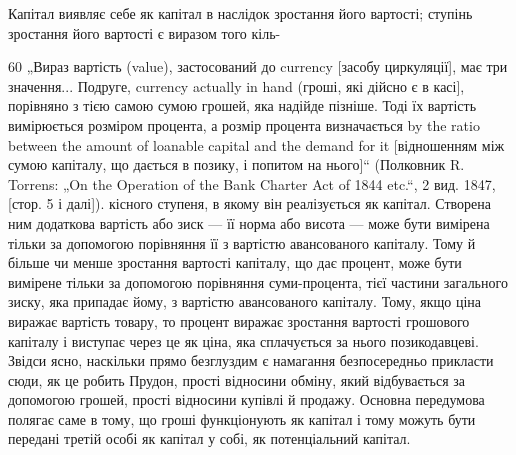 Капітал виявляє себе як капітал в наслідок зростання його
вартості; ступінь зростання його вартості є виразом того кіль-

60 „Вираз вартість (value), застосований до currency [засобу циркуляції], має
три значення... Подруге, currency actually in hand (гроші, які дійсно є в касі],
порівняно з тією самою сумою грошей, яка надійде пізніше. Тоді їх вартість
вимірюється розміром процента, а розмір процента визначається by the ratio
between the amount of loanable capital and the demand for it [відношенням між
сумою капіталу, що дається в позику, і попитом на нього]“ (Полковник
R. Torrens: „On the Operation of the Bank Charter Act of 1844 etc.“, 2 вид. 1847,
[стор. 5 і далі]).
кісного ступеня, в якому він реалізується як капітал. Створена
ним додаткова вартість або зиск — її норма або висота — може
бути вимірена тільки за допомогою порівняння її з вартістю
авансованого капіталу. Тому й більше чи менше зростання вартості
капіталу, що дає процент, може бути вимірене тільки
за допомогою порівняння суми-процента, тієї частини загального
зиску, яка припадає йому, з вартістю авансованого капіталу. Тому,
якщо ціна виражає вартість товару, то процент виражає зростання
вартості грошового капіталу і виступає через це як ціна,
яка сплачується за нього позикодавцеві. Звідси ясно, наскільки
прямо безглуздим є намагання безпосередньо прикласти сюди, як
це робить Прудон, прості відносини обміну, який відбувається за
допомогою грошей, прості відносини купівлі й продажу. Основна
передумова полягає саме в тому, що гроші функціонують як
капітал і тому можуть бути передані третій особі як капітал у
собі, як потенціальний капітал.

